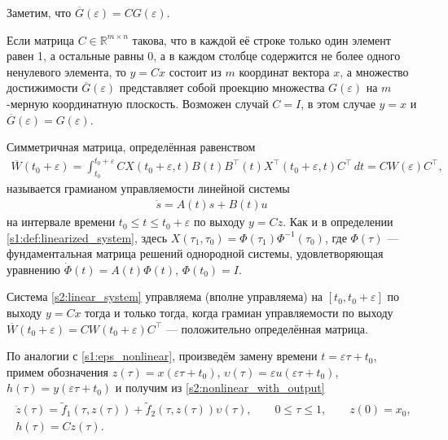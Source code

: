 \documentclass[../main.tex]{subfiles}
\begin{document}
Заметим, что $ \overline{G}(\varepsilon) = C G(\varepsilon) $. 
 
Если матрица $ C \in \mathbb{R}^{m \times n} $ такова, что в каждой её строке только один элемент равен 1, а остальные равны 0, а в каждом столбце содержится не более одного ненулевого элемента, то $ y=Cx $ состоит из $ m$ координат вектора $ x $, а множество достижимости $\overline{G}(\varepsilon)$ представляет собой проекцию множества $ G(\varepsilon) $ на $m$-мерную координатную плоскость. 
Возможен случай $C = I$, в этом случае $y = x$ и $ \overline{G}(\varepsilon) = G(\varepsilon)$.


\begin{definition}
 Симметричная матрица, определённая равенством
 \begin{gather*}
 \overline{W}(t_0 + \varepsilon) = \int_{t_0}^{t_0+\varepsilon} C X(t_0+\varepsilon,t)B(t)B^{\top}(t)X^{\top}(t_0+\varepsilon,t) C^\top \, dt=CW(\varepsilon)C^\top,
 \end{gather*}
 называется грамианом управляемости линейной системы 
 \begin{gather}\label{s2:linear_system}
 	\dot{s} = A(t) s + B(t) u
 \end{gather}
 на интервале времени $ t_0 \leqslant t \leqslant t_0 + \varepsilon $ по выходу $y = C z$. 
 Как и в определении \ref{s1:def:linearized_system}, здесь $X(\tau_1, \tau_0) = \Phi(\tau_1) \Phi^{−1}(\tau_0)$, где $\Phi(\tau)$ ---
 фундаментальная матрица решений однородной системы, удовлетворяющая уравнению
 $\dot{\Phi}(t) = A(t) \Phi(t)$, $\Phi(t_0) = I$.
\end{definition}
 
Система \eqref{s2:linear_system} управляема (вполне управляема) на $ [t_0, t_0 + \varepsilon] $ по выходу $y=Cx$ тогда и только тогда,
когда грамиан управляемости по выходу $ \overline{W}(t_0 + \varepsilon) = C W(t_0 + \varepsilon) C^{\top} $ --- положительно определённая матрица.
 
 
По аналогии с \eqref{s1:eps_nonlinear}, произведём замену времени $t = \varepsilon \tau + t_0$, примем обозначения $z(\tau) = x(\varepsilon \tau + t_0)$, $ \upsilon(\tau) = \varepsilon u(\varepsilon \tau + t_0) $, $h(\tau) = y(\varepsilon \tau + t_0)$ и получим из \eqref{s2:nonlinear_with_output}
\begin{gather}\label{s2:eps_nonlinear_with_output}
\begin{gathered}
	\dot{z}(\tau)=\widetilde{f}_1(\tau,z(\tau))+\widetilde{f}_2(\tau,z(\tau))\upsilon(\tau), \qquad 0 \leqslant \tau \leqslant 1, \qquad z(0) = x_0, \\
	h(\tau) = C z(\tau).
\end{gathered}
\end{gather}
\end{document}
